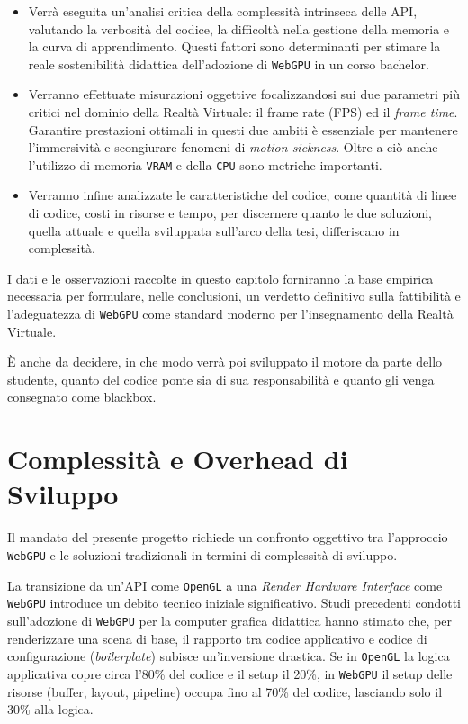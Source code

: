 \documentclass[a4paper, 11pt, twoside]{report}
\begin{document}
\begin{itemize}
    \item Verrà eseguita un'analisi critica della complessità intrinseca delle API, valutando la verbosità del codice,
        la difficoltà nella gestione della memoria e la curva di apprendimento. Questi fattori sono determinanti per
        stimare la reale sostenibilità didattica dell'adozione di \texttt{WebGPU} in un corso bachelor.
    \item Verranno effettuate misurazioni oggettive focalizzandosi sui due parametri più critici nel dominio della
        Realtà Virtuale: il frame rate (FPS) ed il \textit{frame time}. Garantire prestazioni ottimali in questi due
        ambiti è essenziale per mantenere l'immersività e scongiurare fenomeni di \textit{motion sickness}.
        Oltre a ciò anche l'utilizzo di memoria \texttt{VRAM} e della \texttt{CPU} sono metriche importanti.
    \item Verranno infine analizzate le caratteristiche del codice, come quantità di linee di codice, costi in risorse
        e tempo, per discernere quanto le due soluzioni, quella attuale e quella sviluppata sull'arco della tesi,
        differiscano in complessità.
\end{itemize}

I dati e le osservazioni raccolte in questo capitolo forniranno la base empirica necessaria per formulare, nelle
conclusioni, un verdetto definitivo sulla fattibilità e l'adeguatezza di \texttt{WebGPU} come standard moderno per
l'insegnamento della Realtà Virtuale.

È anche da decidere, in che modo verrà poi sviluppato il motore da parte dello studente, quanto del codice ponte sia
di sua responsabilità e quanto gli venga consegnato come blackbox.

\newpage

\section{Complessità e Overhead di Sviluppo}

Il mandato del presente progetto richiede un confronto oggettivo tra l'approccio \texttt{WebGPU} e le soluzioni
tradizionali in termini di complessità di sviluppo.

La transizione da un'API come \texttt{OpenGL} a una \textit{Render Hardware Interface} come \texttt{WebGPU} introduce 
un debito tecnico iniziale significativo. Studi precedenti condotti sull'adozione di
\texttt{WebGPU} per la computer grafica didattica hanno stimato che, per renderizzare una scena di base, il rapporto tra
codice applicativo e codice di configurazione (\textit{boilerplate}) subisce un'inversione drastica.
Se in \texttt{OpenGL} la logica applicativa copre circa l'80\% del codice e il setup il 20\%, in \texttt{WebGPU} il
setup delle risorse (buffer, layout, pipeline) occupa fino al 70\% del codice, lasciando solo il 30\% alla logica.
\end{document}
